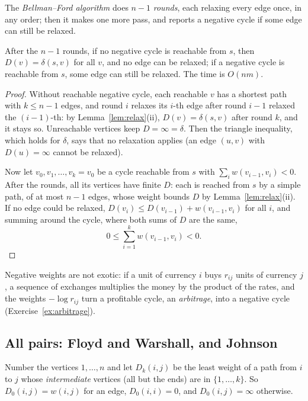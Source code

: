 The \emph{Bellman--Ford algorithm} does $n-1$ \emph{rounds}, each relaxing every edge once, in any order; then it makes one more pass, and reports a negative cycle if some edge can still be relaxed.

\begin{theorem}\label{thm:bellmanford}
After the $n-1$ rounds, if no negative cycle is reachable from $s$, then $D(v)=\delta(s,v)$ for all $v$, and no edge can be relaxed; if a negative cycle is reachable from $s$, some edge can still be relaxed.
The time is $O(nm)$.
\end{theorem}
\begin{proof}
Without reachable negative cycle, each reachable $v$ has a shortest path with $k\le n-1$ edges, and round $i$ relaxes its $i$-th edge after round $i-1$ relaxed the $(i-1)$-th: by Lemma~\ref{lem:relax}(ii), $D(v)=\delta(s,v)$
after round $k$, and it stays so. Unreachable vertices keep $D=\infty=\delta$. Then the triangle inequality, which holds for $\delta$, says that no relaxation applies (an edge $(u,v)$ with $D(u)=\infty$ cannot be relaxed).

Now let $v_0,v_1,\dots,v_k=v_0$ be a cycle reachable from $s$ with $\sum_iw(v_{i-1},v_i)<0$. After the rounds, all its vertices have finite $D$: each is reached from $s$ by a simple path, of at most $n-1$ edges, whose weight bounds $D$ by Lemma~\ref{lem:relax}(ii). If no edge could be relaxed, $D(v_i)\le D(v_{i-1})+w(v_{i-1},v_i)$ for all $i$, and
summing around the cycle, where both sums of $D$ are the same,
\[
0\le\sum_{i=1}^kw(v_{i-1},v_i)<0.
\]
\end{proof}

Negative weights are not exotic: if a unit of currency $i$ buys $r_{ij}$ units of currency $j$, a sequence of exchanges multiplies the money by the product of the rates, and the weights $-\log r_{ij}$ turn a
profitable cycle, an \emph{arbitrage}, into a negative cycle (Exercise~\ref{ex:arbitrage}).

\subsection*{All pairs: Floyd and Warshall, and Johnson}

Number the vertices $1,\dots,n$ and let $D_k(i,j)$ be the least weight of a path from $i$ to $j$ whose \emph{intermediate} vertices (all but the ends) are in $\{1,\dots,k\}$. So $D_0(i,j)=w(i,j)$ for an edge,
$D_0(i,i)=0$, and $D_0(i,j)=\infty$ otherwise.

